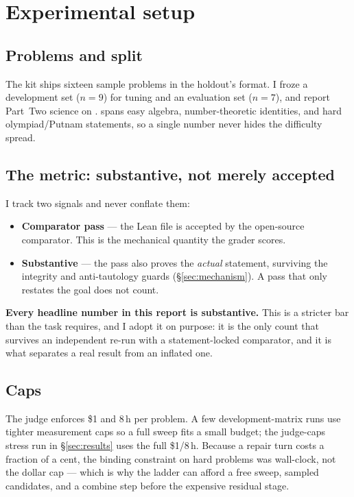 \section{Experimental setup}
\label{sec:setup}

\subsection{Problems and split}
The kit ships sixteen sample problems in the holdout's format. I froze a
development set \Sdev{} ($n=9$) for tuning and an evaluation set \Seval{} ($n=7$),
and report Part~Two science on \Sdev. \Sdev{} spans easy algebra, number-theoretic
identities, and hard olympiad/Putnam statements, so a single number never hides
the difficulty spread.

\subsection{The metric: substantive, not merely accepted}
I track two signals and never conflate them:
\begin{itemize}
  \item \textbf{Comparator pass} --- the Lean file is accepted by the open-source
        comparator. This is the mechanical quantity the grader scores.
  \item \textbf{Substantive} --- the pass also proves the \emph{actual} statement,
        surviving the integrity and anti-tautology guards
        (\S\ref{sec:mechanism}). A pass that only restates the goal does not
        count.
\end{itemize}
\textbf{Every headline number in this report is substantive.} This is a stricter
bar than the task requires, and I adopt it on purpose: it is the only count that
survives an independent re-run with a statement-locked comparator, and it is what
separates a real result from an inflated one.

\subsection{Caps}
The judge enforces \$1 and 8\,h per problem. A few development-matrix runs use
tighter measurement caps so a full sweep fits a small budget; the judge-caps
stress run in \S\ref{sec:results} uses the full \$1/8\,h. Because a repair turn
costs a fraction of a cent, the binding constraint on hard problems was
wall-clock, not the dollar cap --- which is why the ladder can afford a free
sweep, sampled candidates, and a combine step before the expensive residual stage.

